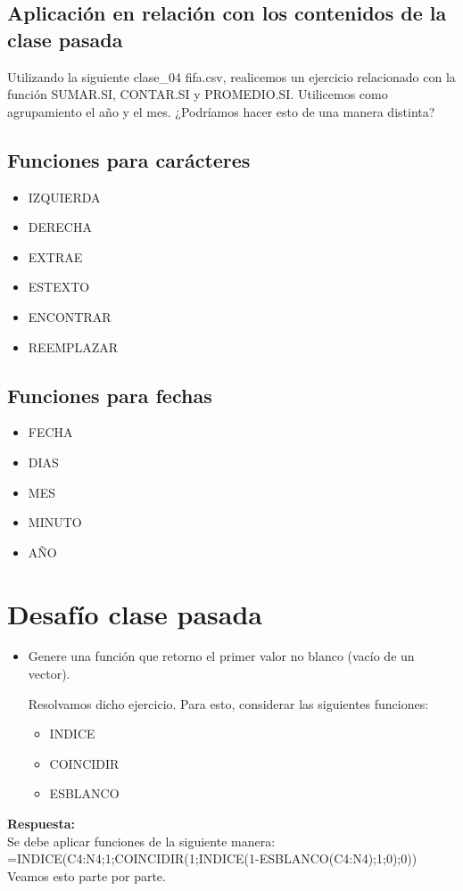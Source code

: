 \documentclass[12 pt,letterpaper]{article}
\newenvironment{solution}
{\begin{mdframed} \textbf{Respuesta:} \ \\}
	{\end{mdframed}}
\begin{document}
\subsection{Aplicación en relación con los contenidos de la clase pasada}

Utilizando la siguiente clase\_04 fifa.csv, realicemos un ejercicio relacionado con la función SUMAR.SI, CONTAR.SI y PROMEDIO.SI. Utilicemos como agrupamiento el año y el mes. ¿Podríamos hacer esto de una manera distinta?

\subsection{Funciones para carácteres}

\begin{itemize}
	\item IZQUIERDA
	\item DERECHA
	\item EXTRAE
	\item ESTEXTO
	\item ENCONTRAR
	\item REEMPLAZAR
\end{itemize}

\subsection{Funciones para fechas}

\begin{itemize}
	\item FECHA
	\item DIAS
	\item MES
	\item MINUTO
	\item AÑO
\end{itemize}

\section{Desafío clase pasada \faWarning}

\begin{itemize}
	\item Genere una función que retorno el primer valor no blanco (vacío de un vector). 
	
	Resolvamos dicho ejercicio. Para esto, considerar las siguientes funciones:
	
	\begin{itemize}
		\item INDICE
		\item COINCIDIR
		\item ESBLANCO
	\end{itemize}

\end{itemize}

\begin{solution}
	Se debe aplicar funciones de la siguiente manera:\\
	
	=INDICE(C4:N4;1;COINCIDIR(1;INDICE(1-ESBLANCO(C4:N4);1;0);0)) \\
	
	Veamos esto parte por parte.
\end{solution} 
\end{document}
